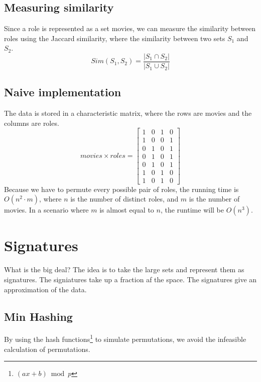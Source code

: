 \documentclass[a4paper,11pt]{article}
\begin{document}
\subsection{Measuring similarity}
Since a role is represented as a set movies, we can measure the similarity between roles using the Jaccard similarity, where the similarity between two sets $S_1$ and $S_2$.
\begin{equation}
Sim(S_1, S_2) = \frac{|S_1 \cap S_2|}{|S_1 \cup S_2|}
\end{equation}

\subsection{Naive implementation}

The data is stored in a characteristic matrix, where the rows are movies and the columns are roles.
\begin{equation}
movies \times roles = 
\begin{bmatrix}
    1 & 0 & 1 & 0\\
    1 & 0 & 0 & 1\\
    0 & 1 & 0 & 1\\
    0 & 1 & 0 & 1\\
    0 & 1 & 0 & 1\\
    1 & 0 & 1 & 0\\
    1 & 0 & 1 & 0
\end{bmatrix}
\end{equation}
Because we have to permute every possible pair of roles, the running time is $O(n^2 \cdot m)$, where $n$ is the number of distinct roles, and $m$ is the number of movies. In a scenario where $m$ is almost equal to $n$, the runtime will be $O(n^3)$.


\section{Signatures}
What is the big deal? The idea is to take the large sets and represent them as signatures. The signiatures take up a fraction af the space. The signatures give an approximation of the data.

\subsection{Min Hashing}

By using the hash functions\footnote{$(ax + b) \bmod p$} to simulate permutations, we avoid the infeasible calculation of permutations.
\end{document}

